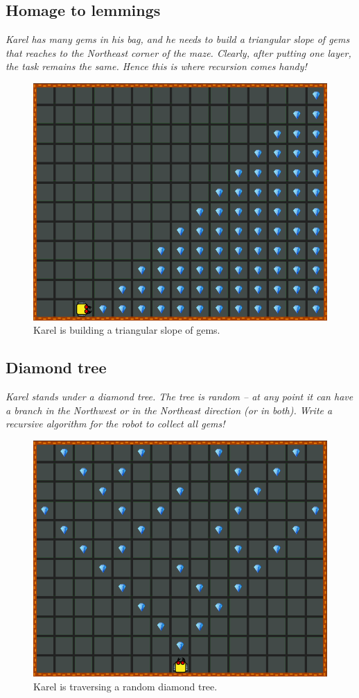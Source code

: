 \newpage


\subsection{Homage to lemmings}

{\em Karel has many gems in his bag, and he needs to build a triangular slope of gems that reaches to the Northeast corner of the maze. Clearly, after putting one layer, the task remains the same. Hence this is where recursion comes handy! }

\begin{figure}[!ht]
\begin{center}
\includegraphics[height=0.4\textwidth]{img/g03.png}
\end{center}
\vspace{-4mm}
\caption{Karel is building a triangular slope of gems.}
\label{fig:g03}
\vspace{-1cm}
\end{figure}
\newpage


\subsection{Diamond tree}

{\em Karel stands under a diamond tree. The tree is random -- at any point it can have 
a branch in the Northwest or in the Northeast direction (or in both). Write a recursive 
algorithm for the robot to collect all gems!}

\begin{figure}[!ht]
\begin{center}
\includegraphics[height=0.4\textwidth]{img/g04.png}
\end{center}
\vspace{-4mm}
\caption{Karel is traversing a random diamond tree.}
\label{fig:g04}
\vspace{-10mm}
\end{figure}


